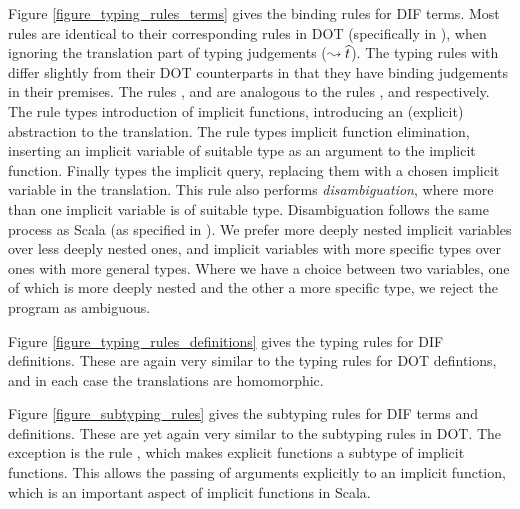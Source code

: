 Figure \ref{figure_typing_rules_terms} gives the binding rules for DIF terms.
Most rules are identical to their corresponding rules in DOT (specifically in
\cite{AGORS16}), when ignoring the translation part of typing judgements
($\leadsto \widehat{t}$). The typing rules with differ slightly from their DOT
counterparts in that they have binding judgements in their premises. The rules
,  and  are analogous to the rules
,  and  respectively. The rule
 types introduction of implicit functions, introducing an
(explicit) abstraction to the translation. The rule  types
implicit function elimination, inserting an implicit variable of suitable type
as an argument to the implicit function. Finally  types the
implicit query, replacing them with a chosen implicit variable in the
translation. This rule also performs \emph{disambiguation}, where more than one
implicit variable is of suitable type. Disambiguation follows the same process
as Scala (as specified in \cite{OBLB18}). We prefer more deeply nested implicit
variables over less deeply nested ones, and implicit variables with more
specific types over ones with more general types. Where we have a choice
between two variables, one of which is more deeply nested and the other a more
specific type, we reject the program as ambiguous.

\begin{figure*}[h]
    
    \caption{Typing and translation rules for DIF terms}
    \label{figure_typing_rules_terms}
\end{figure*}

Figure \ref{figure_typing_rules_definitions} gives the typing rules for DIF
definitions. These are again very similar to the typing rules for DOT
defintions, and in each case the translations are homomorphic.

\begin{figure*}[h]
    
    \caption{Typing and translation rules for DIF definitions}
    \label{figure_typing_rules_definitions}
\end{figure*}

Figure \ref{figure_subtyping_rules} gives the subtyping rules for DIF terms and
definitions. These are yet again very similar to the subtyping rules in DOT.
The exception is the rule , which makes explicit functions
a subtype of implicit functions. This allows the passing of arguments
explicitly to an implicit function, which is an important aspect of implicit functions in Scala.

\begin{figure*}[h]
    
    \caption{Subtyping rules for DIF}
    \label{figure_subtyping_rules}
\end{figure*}
